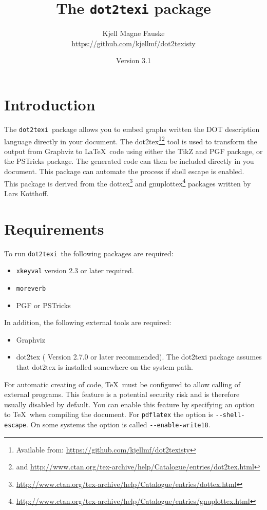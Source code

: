\documentclass[a4paper]{ltxdoc}
\title{The \texttt{dot2texi} package}
\author{Kjell Magne Fauske\\\footnotesize{\url{https://github.com/kjellmf/dot2texisty}}}
\date{Version 3.1}
\newcommand\packagename{\texttt{dot2texi}}
\begin{document}
\maketitle

\section{Introduction}

The \packagename\ package allows you to embed graphs written the DOT description language directly in your document. The dot2tex\footnote{Available from: \url{https://github.com/kjellmf/dot2texisty}}\footnote{and \url{http://www.ctan.org/tex-archive/help/Catalogue/entries/dot2tex.html}} tool is used to transform the output from Graphviz to \LaTeX\ code using either the TikZ and PGF package, or the PSTricks package. The generated code can then be included directly in you document. This package can automate the process if shell escape is enabled.
\\

\noindent
This package is derived from the dottex\footnote{\url{http://www.ctan.org/tex-archive/help/Catalogue/entries/dottex.html}} and gnuplottex\footnote{\url{http://www.ctan.org/tex-archive/help/Catalogue/entries/gnuplottex.html}} packages written by Lars Kotthoff.

\section{Requirements}

To run \packagename\ the following packages are required:
\begin{itemize}
    \item \texttt{xkeyval} version 2.3 or later required.
    \item \texttt{moreverb}
    \item PGF or PSTricks
\end{itemize}
In addition, the following external tools are required:
\begin{itemize}
    \item Graphviz
    \item dot2tex ( Version 2.7.0 or later recommended). The dot2texi package assumes that dot2tex is installed somewhere on the system path.
\end{itemize}


\noindent
For automatic creating of code, \TeX\ must be configured to allow calling of external programs. This feature is a potential security risk and is therefore usually disabled by default. You can enable this feature by specifying an option to \TeX\ when compiling the document. For \texttt{pdflatex} the option is \verb|--shell-escape|. On some systems the option is called \verb|--enable-write18|.
\end{document}
